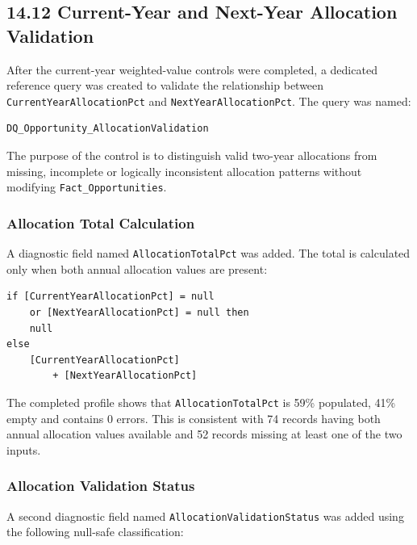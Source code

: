 \documentclass[11pt,a4paper]{article}
\begin{document}
\subsection{14.12 Current-Year and Next-Year Allocation Validation}

After the current-year weighted-value controls were completed, a dedicated
reference query was created to validate the relationship between
\texttt{CurrentYearAllocationPct} and \texttt{NextYearAllocationPct}. The query
was named:

\begin{lstlisting}[style=powerquery]
DQ_Opportunity_AllocationValidation
\end{lstlisting}

The purpose of the control is to distinguish valid two-year allocations from
missing, incomplete or logically inconsistent allocation patterns without
modifying \texttt{Fact\_Opportunities}.

\subsubsection*{Allocation Total Calculation}

A diagnostic field named \texttt{AllocationTotalPct} was added. The total is
calculated only when both annual allocation values are present:

\begin{lstlisting}[style=powerquery]
if [CurrentYearAllocationPct] = null
    or [NextYearAllocationPct] = null then
    null
else
    [CurrentYearAllocationPct]
        + [NextYearAllocationPct]
\end{lstlisting}

The completed profile shows that \texttt{AllocationTotalPct} is 59\% populated,
41\% empty and contains 0 errors. This is consistent with 74 records having
both annual allocation values available and 52 records missing at least one of
the two inputs.

\subsubsection*{Allocation Validation Status}

A second diagnostic field named \texttt{AllocationValidationStatus} was added
using the following null-safe classification:
\end{document}

